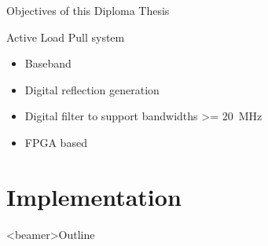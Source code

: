 \documentclass{beamer}
\begin{document}
\begin{frame}{Objectives of this Diploma Thesis}
    \begin{block}{Active Load Pull system}
        \begin{itemize}
            \item Baseband
            \item<2-> Digital reflection generation
            \item<3-> Digital filter to support bandwidths \SI{>= 20}{\mega\hertz}
            \item<4-> FPGA based
        \end{itemize}
    \end{block}
\end{frame}


\section{Implementation}

\begin{frame}<beamer>{Outline}
    \tableofcontents[currentsection]
\end{frame}

\end{document}

